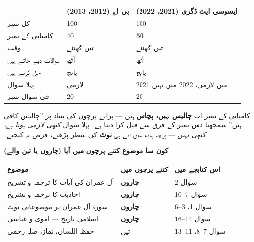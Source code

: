 \medskip
\begin{center}
\begin{tabular}{@{}p{4.4cm} p{4.6cm} p{5.0cm}@{}}
\toprule
 & \textbf{بی اے (\textenglish{2012}، \textenglish{2013})}
 & \textbf{ایسوسی ایٹ ڈگری (\textenglish{2021}، \textenglish{2022})} \\
\midrule
کل نمبر            & \textenglish{100} & \textenglish{100} \\
کامیابی کے نمبر     & \textenglish{40}  & \textbf{\textenglish{50}} \\
وقت                & تین گھنٹے          & تین گھنٹے \\
سوالات دیے جاتے ہیں & آٹھ               & آٹھ \\
حل کرنے ہیں         & پانچ              & پانچ \\
پہلا سوال           & لازمی             & \textenglish{2021} میں لازمی، \textenglish{2022} میں نہیں \\
فی سوال نمبر        & \textenglish{20}  & \textenglish{20} \\
\bottomrule
\end{tabular}
\end{center}

\medskip
\begin{ghalti}
کامیابی کے نمبر اب \textbf{چالیس نہیں، پچاس} ہیں --- پرانے پرچوں کی بنیاد پر
''چالیس کافی ہیں'' سمجھنا دس نمبر کے فرق سے فیل کرا دیتا ہے۔ پہلا سوال
\emph{کبھی لازمی ہوتا ہے، کبھی نہیں} --- پرچہ ہاتھ میں آتے ہی \textbf{نوٹ} کی
سطر پڑھیے، فرض نہ کیجیے۔
\end{ghalti}

\medskip
\noindent
\textbf{\color{bmblue}کون سا موضوع کتنے پرچوں میں آیا (چاروں یا تین والے)}

\smallskip
\begin{center}
\begin{tabular}{@{}p{6.8cm} p{2.4cm} p{5.0cm}@{}}
\toprule
\textbf{موضوع} & \textbf{کتنے پرچوں میں} & \textbf{اس کتابچے میں} \\
\midrule
آل عمران کی آیات کا ترجمہ و تشریح & \textbf{چاروں} & سوال \textenglish{2} \\
احادیث کا ترجمہ و تشریح            & \textbf{چاروں} & سوال \textenglish{7--10} \\
سورۃ آل عمران پر موضوعاتی نوٹ      & \textbf{چاروں} & سوال \textenglish{1}، \textenglish{3--6} \\
اسلامی تاریخ --- اموی و عباسی       & \textbf{چاروں} & سوال \textenglish{14--16} \\
حفظ اللسان، نماز، صلہ رحمی          & تین            & سوال \textenglish{7--8}، \textenglish{11--13} \\
\bottomrule
\end{tabular}
\end{center}

